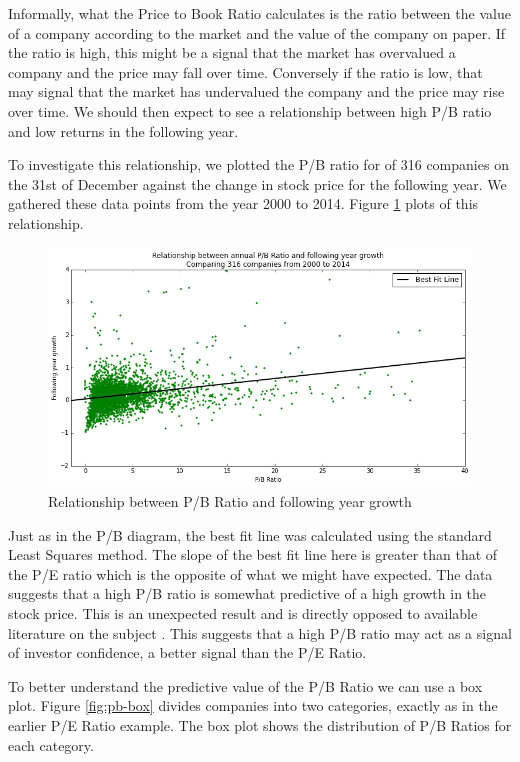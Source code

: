 \documentclass{report}
\begin{document}
Informally, what the Price to Book Ratio calculates is the ratio between the value of a company according to the market and the value of the company on paper. If the ratio is high, this might be a signal that the market has overvalued a company and the price may fall over time. Conversely if the ratio is low, that may signal that the market has undervalued the company and the price may rise over time. We should then expect to see a relationship between high P/B ratio and low returns in the following year. 

To investigate this relationship, we plotted the P/B ratio for of 316 companies on the 31st of December against the change in stock price for the following year. We gathered these data points from the year 2000 to 2014. Figure \ref{fig:pb-abs} plots of this relationship.

\begin{figure}[H]
	\caption{Relationship between P/B Ratio and following year growth}
	\centerline{\includegraphics[width=\textwidth]{vis/pb-ratio-abs.png}}
	\label{fig:pb-abs}
\end{figure}

Just as in the P/B diagram, the best fit line was calculated using the standard Least Squares method. The slope of the best fit line here is greater than that of the P/E ratio which is the opposite of what we might have expected. The data suggests that a high P/B ratio is somewhat predictive of a high growth in the stock price. This is an unexpected result and is directly opposed to available literature on the subject \cite{jensen1997new}. This suggests that a high P/B ratio may act as a signal of investor confidence, a better signal than the P/E Ratio. 

To better understand the predictive value of the P/B Ratio we can use a box plot. Figure \ref{fig:pb-box} divides companies into two categories, exactly as in the earlier P/E Ratio example. The box plot shows the distribution of P/B Ratios for each category.
\end{document}
